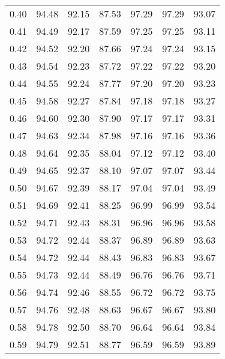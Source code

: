 \begin{tabular}{|c|c|c|c|c|c|c|}
      0.40 &     94.48 &     92.15 &      87.53 &   97.29 &      97.29 &         93.07 \\
      0.41 &     94.49 &     92.17 &      87.59 &   97.25 &      97.25 &         93.11 \\
      0.42 &     94.52 &     92.20 &      87.66 &   97.24 &      97.24 &         93.15 \\
      0.43 &     94.54 &     92.23 &      87.72 &   97.22 &      97.22 &         93.20 \\
      0.44 &     94.55 &     92.24 &      87.77 &   97.20 &      97.20 &         93.23 \\
      0.45 &     94.58 &     92.27 &      87.84 &   97.18 &      97.18 &         93.27 \\
      0.46 &     94.60 &     92.30 &      87.90 &   97.17 &      97.17 &         93.31 \\
      0.47 &     94.63 &     92.34 &      87.98 &   97.16 &      97.16 &         93.36 \\
      0.48 &     94.64 &     92.35 &      88.04 &   97.12 &      97.12 &         93.40 \\
      0.49 &     94.65 &     92.37 &      88.10 &   97.07 &      97.07 &         93.44 \\
      0.50 &     94.67 &     92.39 &      88.17 &   97.04 &      97.04 &         93.49 \\
      0.51 &     94.69 &     92.41 &      88.25 &   96.99 &      96.99 &         93.54 \\
      0.52 &     94.71 &     92.43 &      88.31 &   96.96 &      96.96 &         93.58 \\
      0.53 &     94.72 &     92.44 &      88.37 &   96.89 &      96.89 &         93.63 \\
      0.54 &     94.72 &     92.44 &      88.43 &   96.83 &      96.83 &         93.67 \\
      0.55 &     94.73 &     92.44 &      88.49 &   96.76 &      96.76 &         93.71 \\
      0.56 &     94.74 &     92.46 &      88.55 &   96.72 &      96.72 &         93.75 \\
      0.57 &     94.76 &     92.48 &      88.63 &   96.67 &      96.67 &         93.80 \\
      0.58 &     94.78 &     92.50 &      88.70 &   96.64 &      96.64 &         93.84 \\
      0.59 &     94.79 &     92.51 &      88.77 &   96.59 &      96.59 &         93.89 \\

\end{tabular}
